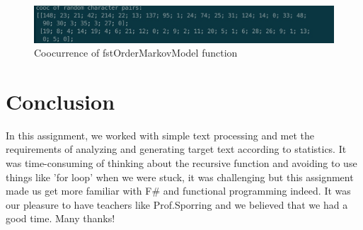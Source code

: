 \documentclass{article}
\begin{document}
\begin{figure}[htbp]
      \centering
      \includegraphics[width=\linewidth]{coocofcharacterpairs}
      \caption{Coocurrence of fstOrderMarkovModel function}
      \label{fig:coocofcharacterpairs}
\end{figure}

\section{Conclusion}

In this assignment, we worked with simple text processing and met the requirements of analyzing and generating target text according to statistics. It was time-consuming of thinking about the recursive function and avoiding to use things like 'for loop' when we were stuck, it was challenging but this assignment made us get more familiar with F\# and functional programming indeed. It was our pleasure to have teachers like Prof.Sporring and we believed that we had a good time. Many thanks!







\end{document}
